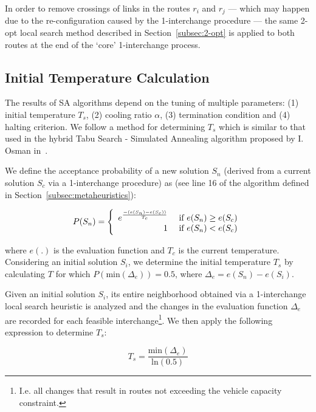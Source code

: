 In order to remove crossings of links in the routes $r_i$ and $r_j$ --- which 
may happen due to the re-configuration caused by the 1-interchange 
procedure --- the same 2-opt local search method described in 
Section~\ref{subsec:2-opt} is applied to both routes at the end of the `core' 
1-interchange process.\vertbreak

\subsection{Initial Temperature Calculation}
\label{subsec:cooling}

The results of SA algorithms depend on the tuning of multiple parameters: (1) 
initial temperature $T_s$, (2) cooling ratio $\alpha$, (3) termination 
condition and (4) halting criterion. We follow a method for determining $T_s$ 
which is similar to that used in the hybrid Tabu Search - Simulated 
Annealing algorithm proposed by I. Osman in~\cite{Osman1993}.\vertbreak

We define the acceptance probability of a new solution $S_n$ (derived from a 
current solution 
$S_c$ via a 1-interchange procedure) as (see line 16 of the algorithm defined 
in Section~\ref{subsec:metaheuristics}):

\begin{equation*}
    P(S_n) = \left\{ 
        \begin{array}{rl}
            e^\frac{-(e(S_n) - e(S_c))}{T_c} &\mbox{ \text{if $e(S_n) \geq e(S_c)$}} \\
            1 &\mbox{ \text{if $e(S_n) < e(S_c)$}}
        \end{array} \right.
    \label{eq:sa-accept}
\end{equation*}

where $e(.)$ is the evaluation function and $T_c$ is the current temperature. 
Considering an initial solution $S_i$, we determine the initial temperature 
$T_s$ by calculating $T$ for which $P(\text{min}(\Delta_e)) = 0.5$, 
where $\Delta_e = e(S_n) - e(S_i)$.\vertbreak

Given an initial solution $S_i$, its entire neighborhood obtained via a 
1-interchange local search heuristic is analyzed and the changes in the 
evaluation function $\Delta_e$ 
are recorded for each feasible interchange\footnote{I.e. all changes that 
result in routes not exceeding the vehicle capacity constraint.}. We then 
apply the following expression to determine $T_s$:

\[T_s = \frac{\text{min}(\Delta_{e})}{\text{ln}(0.5)}\]

